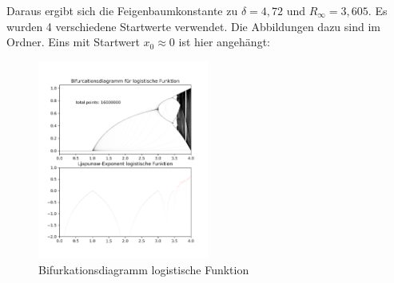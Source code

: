 Daraus ergibt sich die Feigenbaumkonstante zu $\delta = 4,72$ und $R_{\infty} = 3,605$. Es wurden 4 verschiedene Startwerte verwendet. Die Abbildungen dazu sind im Ordner. Eins mit Startwert $x_0 \approx 0$ ist hier angehängt:\\
\begin{figure} [h]
	\centering
	\includegraphics[width=0.5\textwidth]{Aufgabe1/logistic.png}
	\caption{Bifurkationsdiagramm logistische Funktion}
\end{figure}

